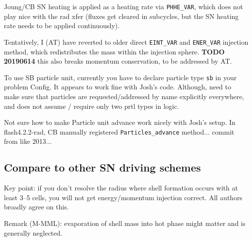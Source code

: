 \documentclass[10pt]{article}
\begin{document}

Joung/CB SN heating is applied as a heating rate via \texttt{PHHE\_VAR}, which
does not play nice with the rad xfer (fluxes get cleared in subcycles, but the
SN heating rate needs to be applied continuously).

Tentatively, I (AT) have reverted to older direct \texttt{EINT\_VAR} and
\texttt{ENER\_VAR} injection method, which redistributes the mass within the
injection sphere.  \textbf{TODO 20190614} this also breaks momentum
conservation, to be addressed by AT.

To use SB particle unit, currently you have to declare particle type
\texttt{sb} in your problem Config.  It appears to work fine with Josh's code.
Although, need to make sure that particles are requested/addressed by name
explicitly everywhere, and does not assume / require only two prtl types in
logic.

Not sure how to make Particle unit advance work nicely with Josh's setup.
In flash4.2.2-rad, CB manually registered  \texttt{Particles\_advance} method...
commit from like 2013...




\subsection{Compare to other SN driving schemes}

Key point: if you don't resolve the radius where shell formation occurs with at
least 3--5 cells, you will not get energy/momentum injection correct.  All
authors broadly agree on this.

Remark (M-MML): evaporation of shell mass into hot phase might matter and is generally
neglected.
\end{document}
